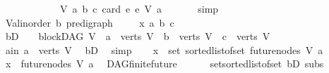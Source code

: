 \begin{isabellebody}
\ \ \ \ \ \ \ \ \ \ \ \ {\isasymlambda}{\isacharparenleft}{\kern0pt}V{\isacharcomma}{\kern0pt}\ a{\isacharcomma}{\kern0pt}\ b{\isacharcomma}{\kern0pt}\ c{\isacharparenright}{\kern0pt}{\isachardot}{\kern0pt}\ card\ {\isacharbraceleft}{\kern0pt}e{\isachardot}{\kern0pt}\ e\ {\isasymrightarrow}\isactrlsup {\isacharasterisk}{\kern0pt}\isactrlbsub V\isactrlesub \ a{\isacharbraceright}{\kern0pt}{\isacharbrackright}{\kern0pt}{\isachardoublequoteclose}\ \isanewline
\ \ \ \ \isamarkupfalse%
\ simp\isanewline
{}\isamarkupfalse%
\ \isanewline
\ \ \isamarkupfalse%
\ V{\isacharcolon}{\kern0pt}{\isacharcolon}{\kern0pt}{\isachardoublequoteopen}{\isacharparenleft}{\kern0pt}{\isacharprime}{\kern0pt}a{\isacharcolon}{\kern0pt}{\isacharcolon}{\kern0pt}linorder{\isacharcomma}{\kern0pt}\ {\isacharprime}{\kern0pt}b{\isacharparenright}{\kern0pt}\ pre{\isacharunderscore}{\kern0pt}digraph{\isachardoublequoteclose}\ \isanewline
\ \ \isamarkupfalse%
\ x\ a\ b\ c\isanewline
\ \ \isamarkupfalse%
\ bD{\isacharcolon}{\kern0pt}\ {\isachardoublequoteopen}\ {\isasymnot}\ {\isacharparenleft}{\kern0pt}{\isasymnot}\ blockDAG\ V\ {\isasymor}\ a\ {\isasymnotin}\ verts\ V\ {\isasymor}\ b\ {\isasymnotin}\ verts\ V\ {\isasymor}\ c\ {\isasymnotin}\ verts\ V{\isacharparenright}{\kern0pt}{\isachardoublequoteclose}\isanewline
\ \ \isamarkupfalse%
\ \isamarkupfalse%
\ a{\isacharunderscore}{\kern0pt}in{\isacharcolon}{\kern0pt}\ {\isachardoublequoteopen}a\ {\isasymin}\ verts\ V{\isachardoublequoteclose}\ \isamarkupfalse%
\ bD\ \isamarkupfalse%
\ simp\isanewline
\ \ \isamarkupfalse%
\ {\isachardoublequoteopen}x\ {\isasymin}\ set\ {\isacharparenleft}{\kern0pt}sorted{\isacharunderscore}{\kern0pt}list{\isacharunderscore}{\kern0pt}of{\isacharunderscore}{\kern0pt}set\ {\isacharparenleft}{\kern0pt}future{\isacharunderscore}{\kern0pt}nodes\ V\ a{\isacharparenright}{\kern0pt}{\isacharparenright}{\kern0pt}{\isachardoublequoteclose}\isanewline
\ \ \isamarkupfalse%
\ \isamarkupfalse%
\ {\isachardoublequoteopen}x\ {\isasymin}\ future{\isacharunderscore}{\kern0pt}nodes\ V\ a{\isachardoublequoteclose}\ \isamarkupfalse%
\ DAG{\isachardot}{\kern0pt}finite{\isacharunderscore}{\kern0pt}future\isanewline
\ \ \ \ \ \ set{\isacharunderscore}{\kern0pt}sorted{\isacharunderscore}{\kern0pt}list{\isacharunderscore}{\kern0pt}of{\isacharunderscore}{\kern0pt}set\ bD\ subs\isanewline
\ \ \ \ \isamarkupfalse%

\end{isabellebody}
